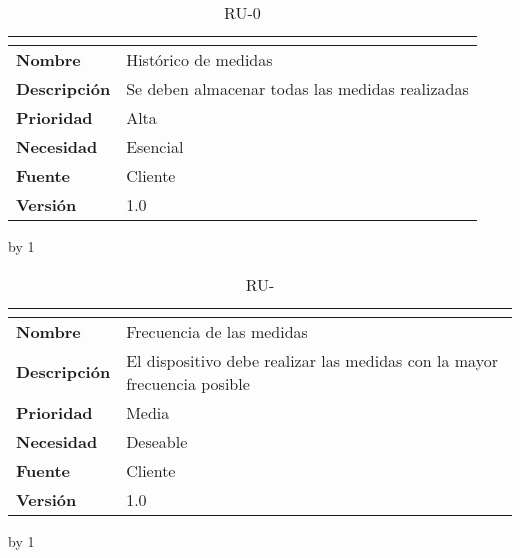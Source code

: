 \begin{table}[H]
	\caption{RU-0\number\ru}
	\begin{tabular}{|l|p{}|}
		\hline
		\multicolumn{2}{|c|}{\cellcolor[HTML]{BFBFBF}{\color[HTML]{000000} \textbf{RU-0\number\ru}}} \\ \hline
		\textbf{Nombre}      & Histórico de medidas                            \\ \hline
		\textbf{Descripción} & Se deben almacenar todas las medidas realizadas \\ \hline
		\textbf{Prioridad}   & Alta                                            \\ \hline
		\textbf{Necesidad}   & Esencial                                        \\ \hline
		\textbf{Fuente}      & Cliente                                         \\ \hline
		\textbf{Versión}     & 1.0                                             \\ \hline
	\end{tabular}
\end{table}
\advance\ru by 1
\begin{table}[H]
	\caption{RU-\number\ru}
	\begin{tabular}{|l|p{}|}
		\hline
		\multicolumn{2}{|c|}{\cellcolor[HTML]{BFBFBF}{\color[HTML]{000000} \textbf{RU-\number\ru}}} \\ \hline
		\textbf{Nombre}      & Frecuencia de las medidas                                                \\ \hline
		\textbf{Descripción} & El dispositivo debe realizar las medidas con la mayor frecuencia posible \\ \hline
		\textbf{Prioridad}   & Media                                                                    \\ \hline
		\textbf{Necesidad}   & Deseable                                                                 \\ \hline
		\textbf{Fuente}      & Cliente                                                                  \\ \hline
		\textbf{Versión}     & 1.0                                                                      \\ \hline
	\end{tabular}
\end{table}
\advance\ru by 1
